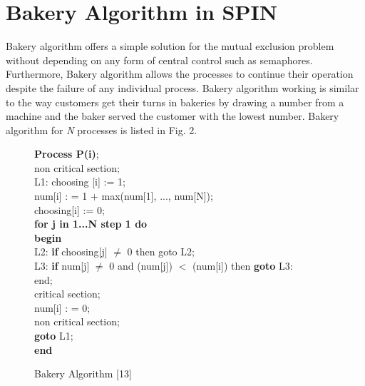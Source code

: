 \documentclass[conference]{IEEEtran}
\begin{document}
\section{Bakery Algorithm in SPIN}
Bakery algorithm \cite{13} offers a simple solution for the mutual exclusion problem without depending on any form of central control such 
as semaphores. Furthermore, Bakery algorithm allows the processes to continue their operation despite the failure of any individual process. 
Bakery algorithm working is similar to the way customers get their turns in bakeries by drawing a number from a machine and the baker served the 
customer with the lowest number. Bakery algorithm for \textit{N} processes is listed in Fig. 2.
\begin{figure}[!ht]
\hspace{0.2cm}\textbf{Process P(i)};\\
\hspace*{0.2cm}non critical section;\\
\hspace*{0.2cm}L1: choosing [i] := 1;\\
\hspace*{0.4cm}num[i] : = 1 + max(num[1], ..., num[N]);\\
\hspace*{0.4cm}choosing[i] := 0;\\
 \hspace*{0.4cm}\textbf{for j in 1...N step 1 do}\\
\hspace*{0.5cm}\textbf{begin}\\
\hspace*{0.5cm}L2: \textbf{if} choosing[j] $\neq$ 0 then goto L2;\\
\hspace*{0.5cm}L3: \textbf{if} num[j] $\neq$ 0 and (num[j]) $<$ (num[i]) then \textbf{goto} L3:\\
\hspace*{0.5cm}end;\\
\hspace*{0.4cm}critical section;\\
\hspace*{0.4cm}num[i] : = 0;\\
\hspace*{0.4cm}non critical section;\\
\hspace*{0.4cm}\textbf{goto} L1;\\
\hspace*{0.2cm}\textbf{end}
\caption{Bakery Algorithm [13]}
\end{figure}
\end{document}
